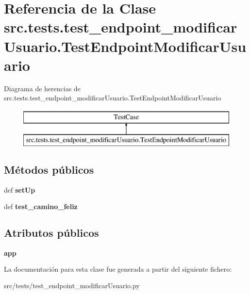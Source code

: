 \hypertarget{classsrc_1_1tests_1_1test__endpoint__modificar_usuario_1_1_test_endpoint_modificar_usuario}{\section{Referencia de la Clase src.\-tests.\-test\-\_\-endpoint\-\_\-modificar\-Usuario.\-Test\-Endpoint\-Modificar\-Usuario}
\label{classsrc_1_1tests_1_1test__endpoint__modificar_usuario_1_1_test_endpoint_modificar_usuario}
}
Diagrama de herencias de src.\-tests.\-test\-\_\-endpoint\-\_\-modificar\-Usuario.\-Test\-Endpoint\-Modificar\-Usuario\begin{figure}[H]
\begin{center}
\leavevmode
\includegraphics[height=2.000000cm]{classsrc_1_1tests_1_1test__endpoint__modificar_usuario_1_1_test_endpoint_modificar_usuario}
\end{center}
\end{figure}
\subsection*{Métodos públicos}
\begin{DoxyCompactItemize}
\item 
\hypertarget{classsrc_1_1tests_1_1test__endpoint__modificar_usuario_1_1_test_endpoint_modificar_usuario_ab6a402aec4fda5bd40e9a8c565790a16}{def {\bfseries set\-Up}}\label{classsrc_1_1tests_1_1test__endpoint__modificar_usuario_1_1_test_endpoint_modificar_usuario_ab6a402aec4fda5bd40e9a8c565790a16}

\item 
\hypertarget{classsrc_1_1tests_1_1test__endpoint__modificar_usuario_1_1_test_endpoint_modificar_usuario_a16b806ce3eb77a909f3e6064628bf78b}{def {\bfseries test\-\_\-camino\-\_\-feliz}}\label{classsrc_1_1tests_1_1test__endpoint__modificar_usuario_1_1_test_endpoint_modificar_usuario_a16b806ce3eb77a909f3e6064628bf78b}

\end{DoxyCompactItemize}
\subsection*{Atributos públicos}
\begin{DoxyCompactItemize}
\item 
\hypertarget{classsrc_1_1tests_1_1test__endpoint__modificar_usuario_1_1_test_endpoint_modificar_usuario_abd973171598d4f1f872bbecd6dfb8f59}{{\bfseries app}}\label{classsrc_1_1tests_1_1test__endpoint__modificar_usuario_1_1_test_endpoint_modificar_usuario_abd973171598d4f1f872bbecd6dfb8f59}

\end{DoxyCompactItemize}


La documentación para esta clase fue generada a partir del siguiente fichero\-:\begin{DoxyCompactItemize}
\item 
src/tests/test\-\_\-endpoint\-\_\-modificar\-Usuario.\-py\end{DoxyCompactItemize}
